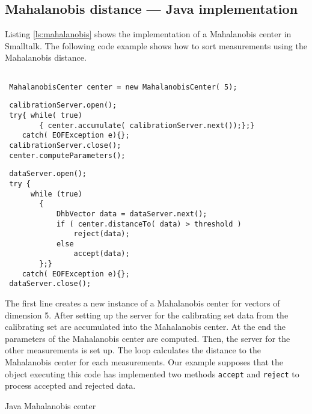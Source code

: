\documentclass[twoside]{book}
\begin{document}
\subsection{Mahalanobis distance --- Java implementation}
Listing \ref{ls:mahalanobis} shows the implementation of a
Mahalanobis center in Smalltalk. The following code example shows
how to sort measurements using the Mahalanobis distance.
\begin{codeExample}
\begin{verbatim}

 MahalanobisCenter center = new MahalanobisCenter( 5);
\end{verbatim}
\begin{verbatim}
 calibrationServer.open();
 try{ while( true)
        { center.accumulate( calibrationServer.next());};}
    catch( EOFException e){};
 calibrationServer.close();
 center.computeParameters();
\end{verbatim}
\begin{verbatim}
 dataServer.open();
 try {
      while (true)
        {
            DhbVector data = dataServer.next();
            if ( center.distanceTo( data) > threshold )
                reject(data);
            else
                accept(data);
        };}
    catch( EOFException e){};
 dataServer.close();
\end{verbatim}
\end{codeExample}
The first line creates a new instance of a Mahalanobis center for
vectors of dimension 5. After setting up the server for the
calibrating set data from the calibrating set are accumulated into
the Mahalanobis center. At the end the parameters of the
Mahalanobis center are computed. Then, the server for the other
measurements is set up. The loop calculates the distance to the
Mahalanobis center for each measurements. Our example supposes
that the object executing this code has implemented two methods
{\tt accept} and {\tt reject} to process accepted and rejected
data.

\begin{listing} Java Mahalanobis center \label{lj:mahalanobis}

\end{listing}
\end{document}
